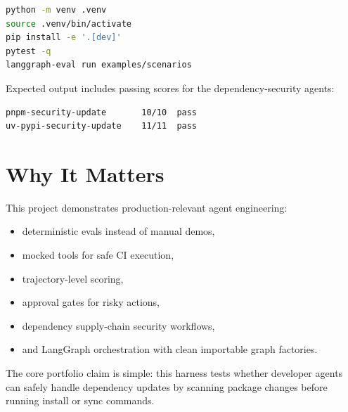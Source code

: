 \documentclass[11pt]{article}
\begin{document}
\begin{lstlisting}[language=bash,caption={Install and run}]
python -m venv .venv
source .venv/bin/activate
pip install -e '.[dev]'
pytest -q
langgraph-eval run examples/scenarios
\end{lstlisting}

Expected output includes passing scores for the dependency-security agents:

\begin{lstlisting}[caption={Example eval output}]
pnpm-security-update       10/10  pass
uv-pypi-security-update    11/11  pass
\end{lstlisting}

\section{Why It Matters}

This project demonstrates production-relevant agent engineering:

\begin{itemize}[noitemsep]
  \item deterministic evals instead of manual demos,
  \item mocked tools for safe CI execution,
  \item trajectory-level scoring,
  \item approval gates for risky actions,
  \item dependency supply-chain security workflows,
  \item and LangGraph orchestration with clean importable graph factories.
\end{itemize}

The core portfolio claim is simple: this harness tests whether developer agents can safely handle dependency updates by scanning package changes before running install or sync commands.
\end{document}
